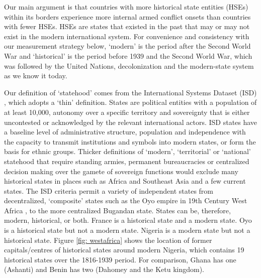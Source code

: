 Our main argument is that countries with more historical state entities (HSEs)
within its borders experience more internal armed conflict onsets than countries
with fewer HSEs. HSEs are states that existed in the past that may or may not
exist in the modern international system. For convenience and consistency with
our measurement strategy below, `modern' is the period after the Second World
War and `historical' is the period before 1939 and the Second World War, which
was followed by the United Nations, decolonization and the modern-state system
as we know it today. 

Our definition of `statehood' comes from the International Systems Dataset (ISD)
\citep{Butcher2020}, which adopts a `thin' definition. States are
political entities with a population of at least 10,000, autonomy over a
specific territory and sovereignty that is either uncontested or acknowledged by
the relevant international actors. ISD states have a baseline level of
administrative structure, population and independence with the capacity to
transmit institutions and symbols into modern states, or form the basis for
ethnic groups. Thicker definitions of `modern', `territorial' or `national'
statehood that require standing armies, permanent bureaucracies or centralized
decision making over the gamete of sovereign functions would exclude many
historical states in places such as Africa and Southeast Asia
\citep{Spruyt1998} and a few current states. The ISD criteria permit a
variety of independent states from decentralized, `composite' states
\citep{Nexon2009} such as the Oyo empire in 19th Century West Africa
\citep{Law1977}, to the more centralized Bugandan state. States can be,
therefore, modern, historical, or both. France is a historical state and a
modern state. Oyo is a historical state but not a modern state. Nigeria is a
modern state but not a historical state. Figure \ref{fig: westafrica} shows the
location of former capitals/centres of historical states around modern Nigeria, which contains 19 historical
states over the 1816-1939 period. For comparison, Ghana has one (Ashanti) and  Benin has two (Dahomey and the Ketu kingdom). 

